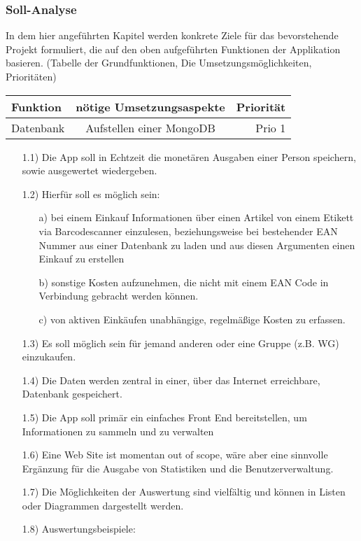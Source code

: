 \documentclass[12pt,a4paper]{article}
\begin{document}
\subsubsection{Soll-Analyse}
In dem hier angeführten Kapitel werden konkrete Ziele für das bevorstehende Projekt formuliert, die auf den oben aufgeführten Funktionen der Applikation basieren. (Tabelle der Grundfunktionen, Die Umsetzungsmöglichkeiten, Prioritäten)

\begin{tabular}{|l|c|r|}
\hline
 Funktion & nötige Umsetzungsaspekte & Priorität \\
\hline
Datenbank & Aufstellen einer MongoDB & Prio 1\\
\end{tabular}

\begin{itemize}
 \item[1.1)] 
  Die App soll in Echtzeit die monetären Ausgaben einer Person speichern, sowie ausgewertet wiedergeben.
 \item[1.2)] Hierfür soll es möglich sein:
 \begin{itemize}
 \item[a)] bei einem Einkauf Informationen über einen Artikel von einem Etikett via Barcodescanner einzulesen, beziehungsweise bei bestehender EAN Nummer aus einer Datenbank zu laden und aus diesen Argumenten einen Einkauf zu erstellen
  \item[b)] sonstige Kosten aufzunehmen, die nicht mit einem EAN Code in Verbindung gebracht werden können.
  \item[c)] von aktiven Einkäufen unabhängige, regelmäßige Kosten zu erfassen.
  \end{itemize}
 \item[1.3)] Es soll möglich sein für jemand anderen oder eine Gruppe (z.B. WG) einzukaufen.
 \item[1.4)] Die Daten werden zentral in einer, über das Internet erreichbare, Datenbank gespeichert.
 \item[1.5)] Die App soll primär ein einfaches Front End bereitstellen, um Informationen zu sammeln und zu verwalten
 \item[1.6)] Eine Web Site ist momentan out of scope, wäre aber eine sinnvolle Ergänzung für die Ausgabe von Statistiken und die Benutzerverwaltung.
 \item[1.7)] Die Möglichkeiten der Auswertung sind vielfältig und können in Listen oder Diagrammen dargestellt werden.
 \item[1.8)] Auswertungsbeispiele:

\end{itemize}
\end{document}
